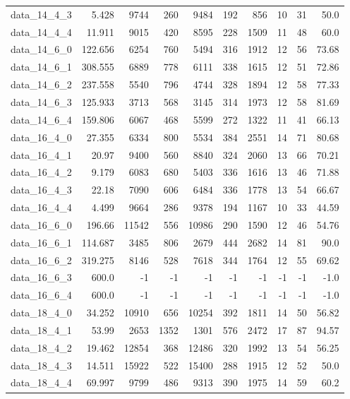 \begin{tabular}{rrrrrrrrrr}
  data\_14\_4\_3 & 5.428 & 9744 & 260 & 9484 & 192 & 856 & 10 & 31 & 50.0 \\
  data\_14\_4\_4 & 11.911 & 9015 & 420 & 8595 & 228 & 1509 & 11 & 48 & 60.0 \\
  data\_14\_6\_0 & 122.656 & 6254 & 760 & 5494 & 316 & 1912 & 12 & 56 & 73.68 \\
  data\_14\_6\_1 & 308.555 & 6889 & 778 & 6111 & 338 & 1615 & 12 & 51 & 72.86 \\
  data\_14\_6\_2 & 237.558 & 5540 & 796 & 4744 & 328 & 1894 & 12 & 58 & 77.33 \\
  data\_14\_6\_3 & 125.933 & 3713 & 568 & 3145 & 314 & 1973 & 12 & 58 & 81.69 \\
  data\_14\_6\_4 & 159.806 & 6067 & 468 & 5599 & 272 & 1322 & 11 & 41 & 66.13 \\
  data\_16\_4\_0 & 27.355 & 6334 & 800 & 5534 & 384 & 2551 & 14 & 71 & 80.68 \\
  data\_16\_4\_1 & 20.97 & 9400 & 560 & 8840 & 324 & 2060 & 13 & 66 & 70.21 \\
  data\_16\_4\_2 & 9.179 & 6083 & 680 & 5403 & 336 & 1616 & 13 & 46 & 71.88 \\
  data\_16\_4\_3 & 22.18 & 7090 & 606 & 6484 & 336 & 1778 & 13 & 54 & 66.67 \\
  data\_16\_4\_4 & 4.499 & 9664 & 286 & 9378 & 194 & 1167 & 10 & 33 & 44.59 \\
  data\_16\_6\_0 & 196.66 & 11542 & 556 & 10986 & 290 & 1590 & 12 & 46 & 54.76 \\
  data\_16\_6\_1 & 114.687 & 3485 & 806 & 2679 & 444 & 2682 & 14 & 81 & 90.0 \\
  data\_16\_6\_2 & 319.275 & 8146 & 528 & 7618 & 344 & 1764 & 12 & 55 & 69.62 \\
  data\_16\_6\_3 & 600.0 & -1 & -1 & -1 & -1 & -1 & -1 & -1 & -1.0 \\
  data\_16\_6\_4 & 600.0 & -1 & -1 & -1 & -1 & -1 & -1 & -1 & -1.0 \\
  data\_18\_4\_0 & 34.252 & 10910 & 656 & 10254 & 392 & 1811 & 14 & 50 & 56.82 \\
  data\_18\_4\_1 & 53.99 & 2653 & 1352 & 1301 & 576 & 2472 & 17 & 87 & 94.57 \\
  data\_18\_4\_2 & 19.462 & 12854 & 368 & 12486 & 320 & 1992 & 13 & 54 & 56.25 \\
  data\_18\_4\_3 & 14.511 & 15922 & 522 & 15400 & 288 & 1915 & 12 & 52 & 50.0 \\
  data\_18\_4\_4 & 69.997 & 9799 & 486 & 9313 & 390 & 1975 & 14 & 59 & 60.2 \\

\end{tabular}
